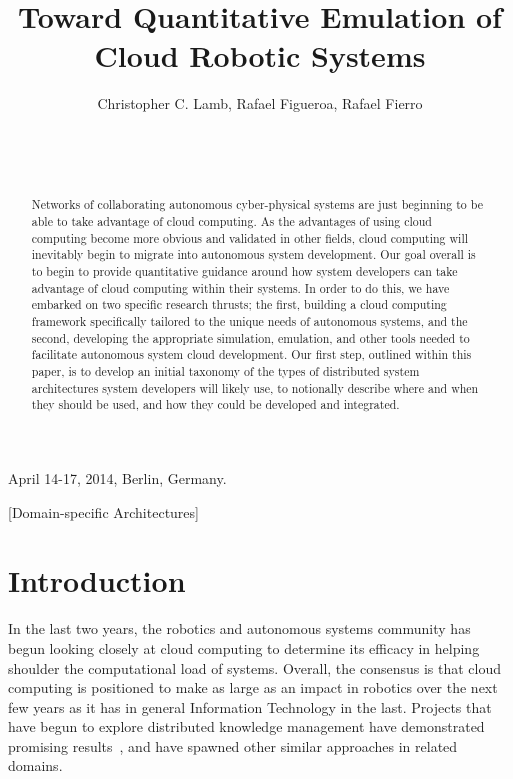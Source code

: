 \documentclass{sig-alternate}
\begin{document}
\title{Toward Quantitative Emulation of Cloud Robotic Systems}


\author{
\alignauthor
Christopher C. Lamb, Rafael Figueroa, Rafael Fierro\\
       \\
       \\
       \\
}

 {April 14-17, 2014, Berlin, Germany.} 

\maketitle

\begin{abstract}
Networks of collaborating autonomous cyber-physical systems are just beginning to be able to take advantage of cloud computing.  As the advantages of using cloud computing become more obvious and validated in other fields, cloud computing will inevitably begin to migrate into autonomous system development.  Our goal overall is to begin to provide quantitative guidance around how system developers can take advantage of cloud computing within their systems.  In order to do this, we have embarked on two specific research thrusts; the first, building a cloud computing framework specifically tailored to the unique needs of autonomous systems, and the second, developing the appropriate simulation, emulation, and other tools needed to facilitate autonomous system cloud development.  Our first step, outlined within this paper, is to develop an initial taxonomy of the types of distributed system architectures system developers will likely use, to notionally describe where and when they should be used, and how they could be developed and integrated.
\end{abstract}

[Domain-specific Architectures]

\section{Introduction}
In the last two years, the robotics and autonomous systems community has begun looking closely at cloud computing to determine its efficacy in helping shoulder the computational load of systems.  Overall, the consensus is that cloud computing is positioned to make as large as an impact in robotics over the next few years as it has in general Information Technology in the last.  Projects that have begun to explore distributed knowledge management have demonstrated promising results~\cite{TeKlPaBe:11, TePeLaBe:12, WaBeCiDa:11}, and have spawned other similar approaches in related domains.  
\end{document}
